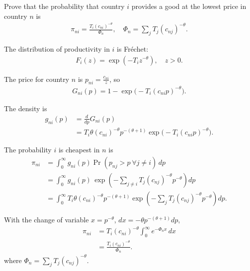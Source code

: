 Prove that the probability that country $i$ provides a good at the lowest price in country $n$ is
\begin{align*}
\pi_{ni} = \frac{T_i (c_{ni})^{-\theta}}{\Phi_n}, \quad
\Phi_n = \sum_j T_j (c_{nj})^{-\theta}.
\end{align*}

\begin{solution}
The distribution of productivity in $i$ is Fréchet:
\begin{align*}
F_i(z) = \exp(-T_i z^{-\theta}), \quad z > 0.
\end{align*}

The price for country $n$ is $p_{ni} = \frac{c_{ni}}{z}$, so
\begin{align*}
G_{ni}(p) = 1 - \exp\!\big(-T_i (c_{ni} p)^{-\theta}\big).
\end{align*}

The density is
\begin{align*}
g_{ni}(p) 
&= \frac{d}{dp} G_{ni}(p) \\
&= T_i \theta (c_{ni})^{-\theta} p^{-(\theta+1)} 
    \exp\!\big(-T_i (c_{ni} p)^{-\theta}\big).
\end{align*}

The probability $i$ is cheapest in $n$ is
\begin{align*}
\pi_{ni} &= \int_0^\infty g_{ni}(p) 
    \Pr(p_{nj} > p \ \forall j \neq i)\, dp \\
&= \int_0^\infty g_{ni}(p)\,
    \exp\!\left(-\sum_{j \neq i} T_j (c_{nj})^{-\theta} p^{-\theta}\right) dp \\
&= \int_0^\infty T_i \theta (c_{ni})^{-\theta} p^{-(\theta+1)} 
    \exp\!\left(-\sum_{j} T_j (c_{nj})^{-\theta} p^{-\theta}\right) dp.
\end{align*}

With the change of variable $x = p^{-\theta}$, $dx = -\theta p^{-(\theta+1)} dp$,
\begin{align*}
\pi_{ni} &= T_i (c_{ni})^{-\theta} 
    \int_0^\infty e^{-\Phi_n x} \, dx \\
&= \frac{T_i (c_{ni})^{-\theta}}{\Phi_n}.
\end{align*}
where $\Phi_n = \sum_j T_j (c_{nj})^{-\theta}$.
\end{solution}


